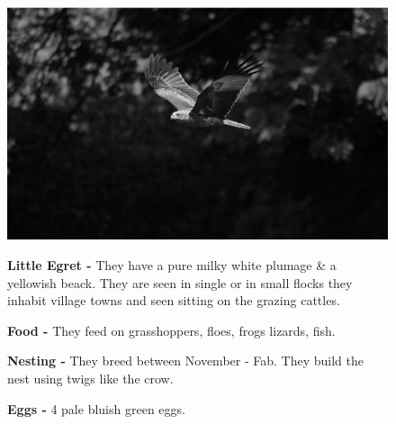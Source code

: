 \begin{figure}[H]
\begin{center}
\includegraphics{figure/Land_birds/01_pariah_kite/pariah-kite.eps}
\end{center}
\medskip
\noindent
{\bf Little Egret -} They have a pure milky white plumage \& a yellowish beack. They are seen in single or in small flocks they inhabit village towns and seen sitting on the grazing cattles.

\medskip
{\bf Food -} They feed on grasshoppers, floes, frogs lizards, fish.

{\bf Nesting -} They breed between November - Fab. They build the nest using twigs like the crow.

{\bf Eggs -} 4 pale bluish green eggs.
\end{figure}

\vfill\eject

~\phantom{a}
\vfill

